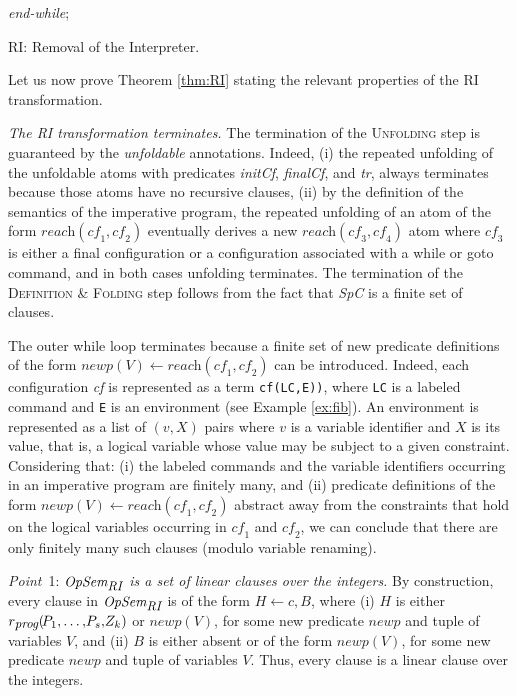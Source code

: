 \documentclass[english]{tlp}
\begin{document}
	\smallskip
	
	\noindent \textit{end-while};
	
	\vspace*{-1.5mm}
	\noindent\hrulefill\nopagebreak
\vspace{-2mm}
\begin{center} RI: Removal of the Interpreter. \end{center}
\nopagebreak

\noindent
Let us now prove Theorem \ref{thm:RI} stating the relevant properties of the RI transformation.

\medskip
\noindent
{\it The RI transformation terminates.} 
The termination of the \textsc{Unfolding} step is guaranteed by the 
{\it unfoldable} annotations. Indeed, (i) the repeated unfolding of the
unfoldable atoms with predicates \textit{initCf\/}, \textit{finalCf\/}, and {\it tr}, 
always terminates because those atoms have no recursive clauses,
(ii) by the definition of the semantics of the imperative program, 
the repeated unfolding of an atom of the form
$\textit{reach}(\textit{cf}_1,\textit{cf}_2)$ eventually derives
a new $\textit{reach}(\textit{cf}_3,\textit{cf}_4)$ atom where
 $\textit{cf}_3$ is either a final configuration or
a configuration associated with a while or goto command, and in both cases
unfolding terminates.
The termination of the \textsc{Definition} \& \textsc{Folding} step
follows from the fact that {\it SpC} is a finite set of clauses. 

The outer while loop terminates because a finite set of new predicate definitions
of the form $\textit{newp}(V)\leftarrow \textit{reach}(\textit{cf}_1,\textit{cf}_2)$
can be introduced.
Indeed, each configuration {\it cf} is represented as a term 
{\tt cf(LC,E))}, where {\tt LC} is a labeled command and 
{\tt E} is an environment (see Example \ref{ex:fib}). 
An environment is represented as a list of $(v,X)$ pairs where 
$v$ is a variable identifier and $X$ is its value, that is, a logical
variable whose value may be subject to a given constraint.
Considering that: (i) the labeled commands and the variable identifiers
occurring in an imperative 
program are finitely many, and
(ii) predicate definitions of the form
 $\textit{newp}(V)\leftarrow \textit{reach}(\textit{cf}_1,\textit{cf}_2)$
abstract away from the constraints that hold on the logical
variables occurring in $\textit{cf}_1$ and $\textit{cf}_2$,
we can conclude that there are only finitely many such clauses (modulo variable renaming).
 

\medskip	
\noindent
{\it Point}~1: {\it $\textit{OpSem}_{\textit{\small{RI}}}$ is a set of linear clauses over the integers.}
By construction, every clause in $\textit{OpSem}_{\textit{\small{RI}}}$ is of the 
form $H \leftarrow c, B$, where
(i) $H$ is either $r_{\textit{\small prog}}(\!P_1,\ldots,\!P_s,\!Z_k)$ or $\textit{newp}(V)$, for some new predicate
$\textit{newp}$ and tuple of variables $V$, and
(ii) $B$ is either absent or of the form $\textit{newp}(V)$, for some new predicate
$\textit{newp}$ and tuple of variables $V$.
Thus, every clause is a linear clause over the integers.
	
\end{document}
